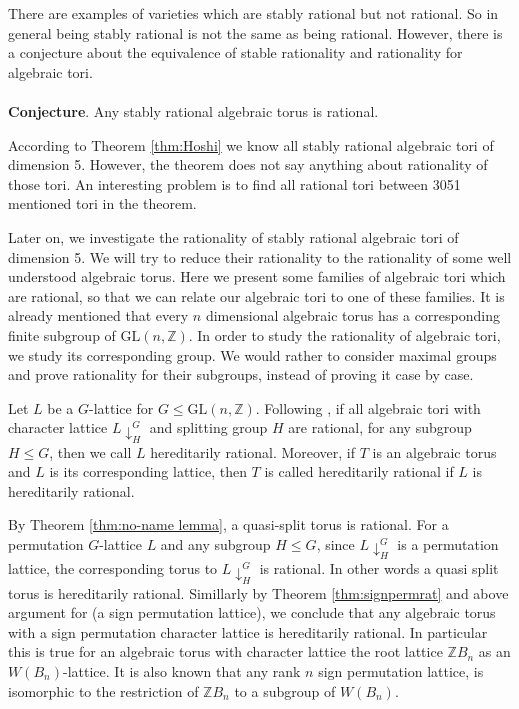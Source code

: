 \documentclass[12pt]{article}
\theoremstyle{plain}
\theoremstyle{definition}
\newcommand{\Z}{\ensuremath{\mathbb{Z}}}
\begin{document}
There are examples of varieties which are stably rational but not rational. So in general 
being stably rational is not the same as being rational. However, there is a conjecture 
about the equivalence of stable rationality and rationality for algebraic tori.\\ \\
 \textbf{Conjecture}. \cite[Section 2.6.1]{Voskresenskii} Any stably rational algebraic 
 torus is rational. 
 
According to Theorem \ref{thm:Hoshi} we know all stably rational algebraic tori of dimension 5. 
However, the theorem does not say anything about rationality of those tori. An interesting 
problem is to find all rational tori between 3051 mentioned tori in the theorem.
 
Later on, we investigate the rationality of stably rational algebraic tori 
of dimension 5.  We will try to reduce their rationality to the rationality of some 
well understood algebraic torus. Here we present some families of 
algebraic tori which are rational, so that we can relate our algebraic tori to one 
of these families. It is already mentioned that every $n$ dimensional algebraic torus 
has a corresponding finite subgroup of $\mathrm{GL}(n,\Z)$. In order to study the 
rationality of algebraic tori, we study its corresponding group. We would rather to 
consider maximal groups and prove rationality for their subgroups, instead of proving 
it case by case.  

Let $L$ be a $G$-lattice for $G\leq \mathrm{GL}(n,\Z)$. Following \cite{Nicole1}, if all algebraic tori with character lattice $L\downarrow_H^G$ and splitting group $H$ are rational, for any 
subgroup $H \leq G$, then we call $L$ hereditarily rational. 
Moreover, if $T$ is an algebraic torus and $L$ is its corresponding lattice, then $T$ is called 
hereditarily rational if $L$ is hereditarily rational.

By Theorem \ref{thm:no-name lemma}, a quasi-split torus is rational. For a permutation 
$G$-lattice $L$ and any subgroup $H\leq G$, since $L\downarrow_H^G$ is a permutation 
lattice, the corresponding torus to $L\downarrow_H^G$ is rational. In other words a 
quasi split torus is hereditarily rational. Simillarly by Theorem \ref{thm:signpermrat} 
and above argument for (a sign permutation lattice), we conclude that any algebraic 
torus with a sign permutation character lattice is hereditarily rational. 
In particular this is true for an algebraic torus with character lattice the root 
lattice $\Z B_n$ as an $W(B_n)$-lattice. It is also known that any rank $n$ sign 
permutation lattice, is isomorphic to the restriction of $\Z B_n$ to a subgroup 
of $W(B_n)$.  
\end{document}
